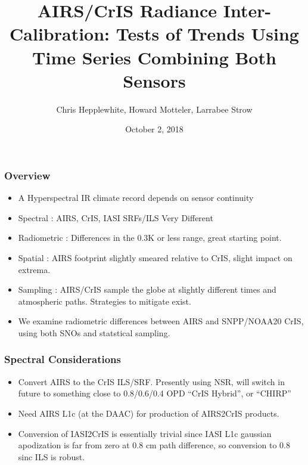 \documentclass[10pt,t]{beamer}
\begin{document}
\title[]{AIRS/CrIS Radiance Inter-Calibration: \newline
  Tests of Trends Using Time Series Combining Both Sensors}
\author{Chris Hepplewhite, Howard Motteler, Larrabee Strow}
\date{October 2, 2018}
\begin{frame}
  \titlepage
\end{frame}
\begin{frame}
  \frametitle{Overview}
  \begin{itemize}
  \item A Hyperspectral IR climate record depends on sensor continuity
  \item Spectral : AIRS, CrIS, IASI SRFs/ILS Very Different
  \item Radiometric : Differences in the 0.3K or less range, great starting point.
  \item Spatial : AIRS footprint slightly smeared relative to CrIS, slight impact on extrema.
    \item Sampling : AIRS/CrIS sample the globe at slightly different times and atmospheric paths.  Strategies to mitigate exist.
    \item We examine radiometric differences between AIRS and SNPP/NOAA20 CrIS, using both SNOs and statstical sampling.

  \end{itemize}
\end{frame}
\begin{frame}
  \frametitle{Spectral Considerations}

  \begin{itemize}
  \item Convert AIRS to the CrIS ILS/SRF.  Presently using NSR, will switch in future to something close to 0.8/0.6/0.4 OPD ``CrIS Hybrid'', or ``CHIRP''
  \item Need AIRS L1c (at the DAAC) for production of AIRS2CrIS products.
  \item Conversion of IASI2CrIS is essentially trivial since IASI L1c gaussian apodization is far from zero at 0.8 cm path difference, so conversion to 0.8 sinc ILS is robust.
    \end{itemize}

\end{frame}
\end{document}
